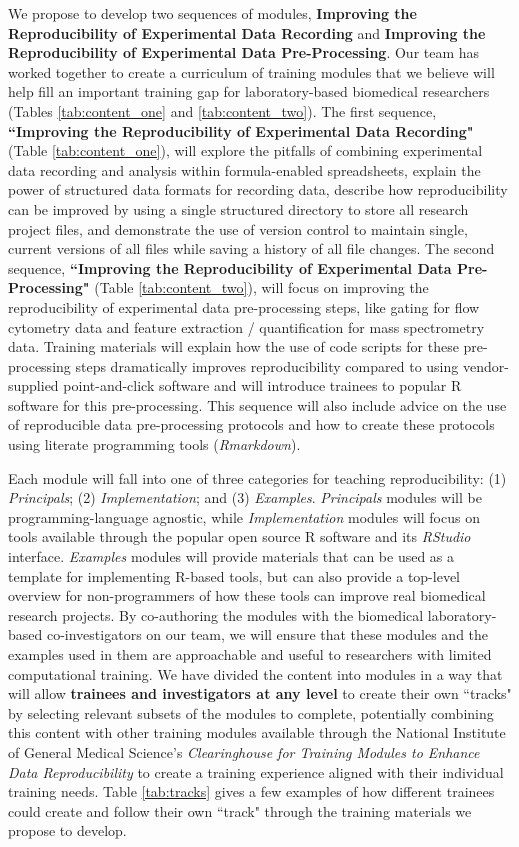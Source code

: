 \documentclass[pdftex,english,11pt,parskip=half]{scrartcl}
\begin{document}
We propose to develop two sequences of modules, \textbf{Improving the
Reproducibility of Experimental Data Recording} and \textbf{Improving the
Reproducibility of Experimental Data Pre-Processing}. Our team has worked
together to create a curriculum of training modules that we believe will help
fill an important training gap for laboratory-based biomedical researchers
(Tables \ref{tab:content_one} and \ref{tab:content_two}). The first sequence,
\textbf{``Improving the Reproducibility of Experimental Data Recording"} (Table
\ref{tab:content_one}), will explore the pitfalls of combining experimental data
recording and analysis within formula-enabled spreadsheets, explain the power of
structured data formats for recording data, describe how reproducibility can be
improved by using a single structured directory to store all research project
files, and demonstrate the use of version control to maintain single, current
versions of all files while saving a history of all file changes. The second
sequence, \textbf{``Improving the Reproducibility of Experimental Data
Pre-Processing"} (Table \ref{tab:content_two}), will focus on improving the
reproducibility of experimental data pre-processing steps, like gating for flow
cytometry data and feature extraction / quantification for mass spectrometry data.
Training materials will explain how the use of code scripts for these pre-processing steps
dramatically improves reproducibility compared to using vendor-supplied
point-and-click software and will introduce trainees to popular R software for
this pre-processing. This sequence will also include advice on the use of reproducible data
pre-processing protocols and how to create these protocols using literate programming tools (\textit{Rmarkdown}).

Each module will fall into one of three categories for teaching reproducibility:
(1) \textit{Principals}; (2) \textit{Implementation}; and (3) \textit{Examples}. \textit{Principals}
modules will be programming-language agnostic, while \textit{Implementation} modules
will focus on tools available through the popular open source R software and its
\textit{RStudio} interface. \textit{Examples} modules will provide materials that can be used as a template for implementing R-based tools, but can also provide a top-level overview for non-programmers of how these tools can improve real biomedical research projects. By co-authoring the modules with the biomedical laboratory-based co-investigators
on our team, we will ensure that these modules and the examples used in them are
approachable and useful to researchers with limited computational training. We
have divided the content into modules in a way that will allow \textbf{trainees
and investigators at any level} to create their own ``tracks" by selecting
relevant subsets of the modules to complete, potentially combining this
content with other training modules available through the National Institute of General Medical Science's \textit{Clearinghouse for Training Modules to Enhance Data Reproducibility}
\cite{clearinghouse} to create a training experience aligned with their individual training needs. Table \ref{tab:tracks} gives a few examples of how different trainees
could create and follow their own ``track" through the training materials we propose to develop.
\end{document}
